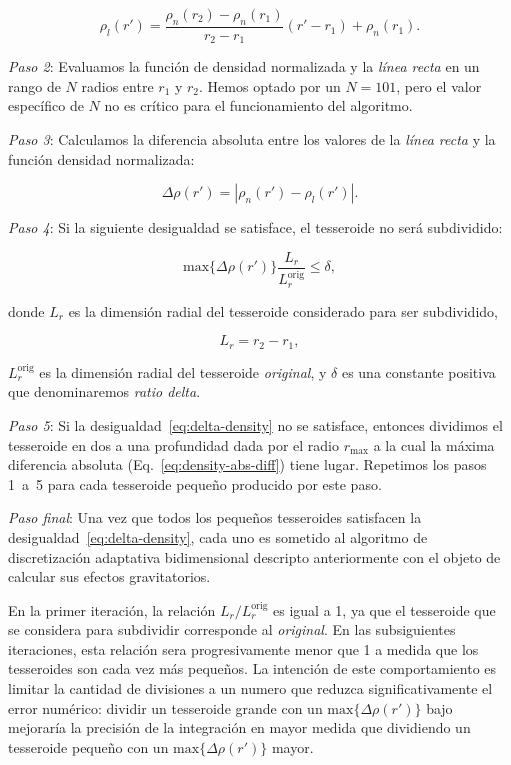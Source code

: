 \begin{equation}
    \rho_l(r') =
    \frac{ \rho_n(r_2) - \rho_n(r_1) }{ r_2 - r_1 } (r' - r_1) + \rho_n(r_1).
    \label{eq:density-reference-line}
\end{equation}

\textit{Paso 2}:
Evaluamos la función de densidad normalizada y la \emph{línea recta} en un
rango de $N$ radios entre $r_1$ y $r_2$. Hemos optado por un $N = 101$, pero el
valor específico de $N$ no es crítico para el funcionamiento del algoritmo.

\textit{Paso 3}:
Calculamos la diferencia absoluta entre los valores de la \emph{línea recta}
y la función densidad normalizada:

\begin{equation}
    \Delta \rho (r') = | \rho_n(r') - \rho_l(r') |.
    \label{eq:density-abs-diff}
\end{equation}

\textit{Paso 4}:
Si la siguiente desigualdad se satisface, el tesseroide no será subdividido:

\begin{equation}
    \text{max}\{ \Delta \rho(r') \} \frac{L_r}{L_r^\text{orig}} \le \delta,
    \label{eq:delta-density}
\end{equation}

\noindent
donde $L_r$ es la dimensión radial del tesseroide considerado para ser
subdividido,

\begin{equation}
    L_r = r_2 - r_1,
\end{equation}

\noindent $L_r^\text{orig}$ es la dimensión radial del tesseroide
\emph{original}, y $\delta$ es una constante positiva que denominaremos
\emph{ratio delta}.

\textit{Paso 5}:
Si la desigualdad~\ref{eq:delta-density} no se satisface, entonces dividimos el
tesseroide en dos a una profundidad dada por el radio $r_\text{max}$ a la cual
la máxima diferencia absoluta (Eq.~\ref{eq:density-abs-diff}) tiene lugar.
Repetimos los pasos 1~a~5 para cada tesseroide pequeño producido por este paso.

\textit{Paso final}:
Una vez que todos los pequeños tesseroides satisfacen la
desigualdad~\ref{eq:delta-density}, cada uno es sometido al algoritmo de
discretización adaptativa bidimensional descripto anteriormente con el objeto
de calcular sus efectos gravitatorios.

En la primer iteración, la relación $L_r/L_r^\text{orig}$ es igual a 1, ya que
el tesseroide que se considera para subdividir corresponde al \emph{original}.
En las subsiguientes iteraciones, esta relación sera progresivamente menor que
1 a medida que los tesseroides son cada vez más pequeños.
La intención de este comportamiento es limitar la cantidad de divisiones a un
numero que reduzca significativamente el error numérico:
dividir un tesseroide grande con un $\text{max}\{ \Delta \rho(r') \}$ bajo
mejoraría la precisión de la integración en mayor medida que dividiendo un
tesseroide pequeño con un $\text{max}\{ \Delta \rho(r') \}$ mayor.

